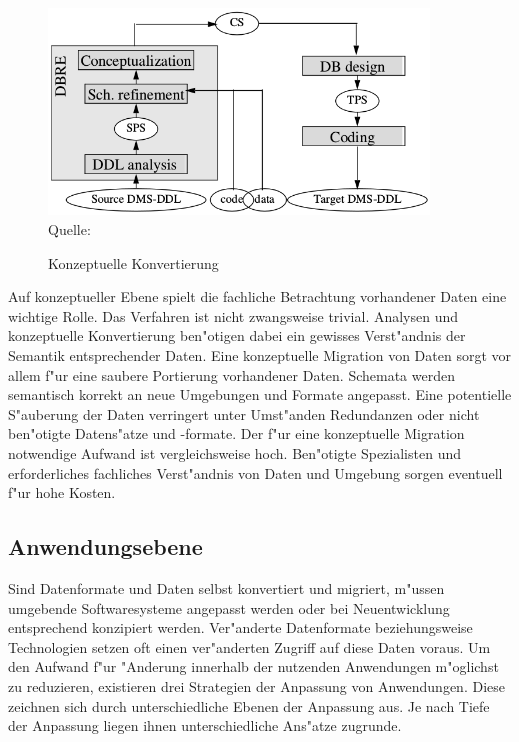 \begin{figure}[h!]
	\centering
	\caption{Konzeptuelle Konvertierung}
	\label{pic:conversion_conceptual}
	\includegraphics[width=0.9\textwidth]{../images/strategies_fig_02b.png} \\
	\tiny Quelle: \citep[Abbildung~2]{henrard-2002}
\end{figure}

Auf konzeptueller Ebene spielt die fachliche Betrachtung vorhandener Daten eine wichtige Rolle. Das Verfahren ist nicht zwangsweise trivial. Analysen und konzeptuelle Konvertierung ben"otigen dabei ein gewisses Verst"andnis der Semantik entsprechender Daten.
\lb
Eine konzeptuelle Migration von Daten sorgt vor allem f"ur eine saubere Portierung vorhandener Daten. Schemata werden semantisch korrekt an neue Umgebungen und Formate angepasst. Eine potentielle S"auberung der Daten verringert unter Umst"anden Redundanzen oder nicht ben"otigte Datens"atze und -formate.
\newpage
Der f"ur eine konzeptuelle Migration notwendige Aufwand ist vergleichsweise hoch. Ben"otigte Spezialisten und erforderliches fachliches Verst"andnis von Daten und Umgebung sorgen eventuell f"ur hohe Kosten.

\subsection{Anwendungsebene}

Sind Datenformate und Daten selbst konvertiert und migriert, m"ussen umgebende Softwaresysteme angepasst werden oder bei Neuentwicklung entsprechend konzipiert werden. Ver"anderte Datenformate beziehungsweise Technologien setzen oft einen ver"anderten Zugriff auf diese Daten voraus. Um den Aufwand f"ur "Anderung innerhalb der nutzenden Anwendungen m"oglichst zu reduzieren, existieren drei Strategien der Anpassung von Anwendungen. Diese zeichnen sich durch unterschiedliche Ebenen der Anpassung aus. Je nach Tiefe der Anpassung liegen ihnen unterschiedliche Ans"atze zugrunde. 

